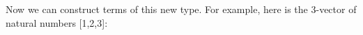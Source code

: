 Now we can construct terms of this new type.
For example, here is the 3-vector of natural numbers [1,2,3]:
\begin{code}%
\>[0]\AgdaSpace{}%
\AgdaSymbol{:}\AgdaSpace{}%
\AgdaSpace{}%
\AgdaSpace{}%
\AgdaSymbol{(}\AgdaSpace{}%
\AgdaSymbol{(}\AgdaSpace{}%
\AgdaSymbol{(}\AgdaSpace{}%
\AgdaSymbol{)))}\<%
\\
\>[0]\AgdaSpace{}%
\AgdaSymbol{=}\AgdaSpace{}%
\AgdaSpace{}%
\<%
\\
\>[0][@{}l@{\AgdaIndent{0}}]%
\>[2]\AgdaOperator{\AgdaInductiveConstructor{::}}\AgdaSpace{}%
\AgdaSymbol{(}\AgdaSpace{}%
\AgdaSymbol{(}\AgdaSpace{}%
\AgdaSymbol{)}\<%
\\
\>[2][@{}l@{\AgdaIndent{0}}]%
\>[4]\AgdaOperator{\AgdaInductiveConstructor{::}}\AgdaSpace{}%
\AgdaSymbol{(}\AgdaSpace{}%
\AgdaSymbol{(}\AgdaSpace{}%
\AgdaSymbol{(}\AgdaSpace{}%
\AgdaSymbol{))}\<%
\\
\>[4][@{}l@{\AgdaIndent{0}}]%
\>[6]\AgdaOperator{\AgdaInductiveConstructor{::}}\AgdaSpace{}%
\AgdaInductiveConstructor{[]}\AgdaSymbol{))}\<%
\end{code}

